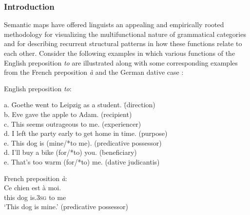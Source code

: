 \subsubsection{Introduction} 
Semantic maps have offered linguists an appealing and empirically rooted methodology for visualizing the multifunctional nature of grammatical categories and for describing recurrent structural patterns in how these functions relate to each other. Consider the following examples in which various functions of the English preposition {\em to} are illustrated along with some corresponding examples from the French preposition {\em à} and the German dative case \citep[taken from][example 2, p. 212 and example sentences on p. 213--215]{haspelmath03geometry}:
 
\ea
English preposition {\em to}:
\label{e:to-dative}
\begin{tabbing}
a. \hspace{0,3cm}    \= Goethe went to Leipzig as a student.  \hspace{1cm} \= (direction)\\
b. \> Eve gave the apple to Adam. \> (recipient)\\
c. \> This seems outrageous to me. \> (experiencer)\\
d. \> I left the party early to get home in time. \> (purpose)\\
e. \> This dog is (mine/*to me). \> (predicative possessor)\\
d. \> I'll buy a bike (for/*to) you. \> (beneficiary) \\
e. \> That's too warm (for/*to) me. \> (dative judicantis)\\
\end{tabbing}
\item French preposition {\em à}:
\\
\gll Ce chien est à moi.\\
this dog is.3\textsc{sg} to me\\
\glt `This dog is mine.' (predicative possessor)\\

